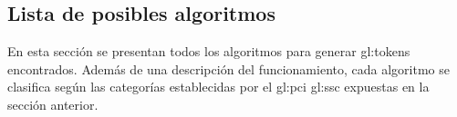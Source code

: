 %
%

\subsection{Lista de posibles algoritmos}

En esta sección se presentan todos los algoritmos para generar
\glspl{gl:token} encontrados. Además de una descripción del funcionamiento,
cada algoritmo se clasifica según las categorías establecidas por el
\gls{gl:pci} \gls{gl:ssc} expuestas en la sección anterior.


